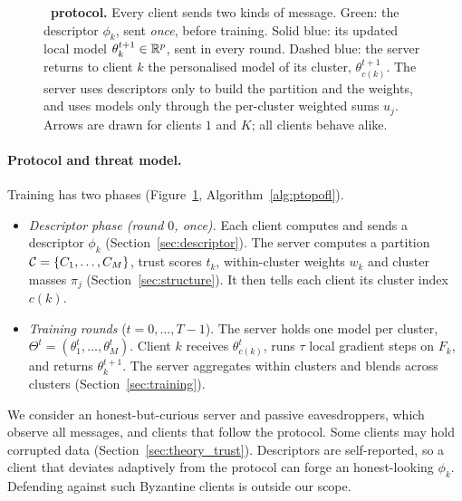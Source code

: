 \begin{figure}[t]
\caption{\textbf{\ptopofl\ protocol.} Every client sends two kinds of message. Green: the
descriptor $\phi_k$, sent \emph{once}, before training. Solid blue: its updated local model
$\theta_k^{t+1}\in\mathbb{R}^p$, sent in every round. Dashed blue: the server returns to client $k$
the personalised model of its cluster, $\theta_{c(k)}^{t+1}$. The server uses descriptors
only to build the partition and the weights, and uses models only through the per-cluster
weighted sums $u_j$. Arrows are drawn for clients $1$ and $K$; all clients behave alike.}
\label{fig:framework}
\end{figure}

\paragraph{Protocol and threat model.}
Training has two phases (Figure~\ref{fig:framework}, Algorithm~\ref{alg:ptopofl}).
\begin{itemize}[leftmargin=1.2em,itemsep=2pt]
  \item \emph{Descriptor phase (round $0$, once).} Each client computes and sends a
    descriptor $\phi_k$ (Section~\ref{sec:descriptor}). The server computes a partition
    $\mathcal{C}=\{C_1,\dots,C_M\}$, trust scores $t_k$, within-cluster weights $w_k$ and cluster
    masses $\pi_j$ (Section~\ref{sec:structure}). It then tells each client its cluster
    index $c(k)$.
  \item \emph{Training rounds} ($t=0,\dots,T-1$). The server holds one model per cluster,
    $\Theta^t=(\theta_1^t,\dots,\theta_M^t)$. Client $k$ receives $\theta^t_{c(k)}$, runs
    $\tau$ local gradient steps on $F_k$, and returns $\theta_k^{t+1}$. The server
    aggregates within clusters and blends across clusters (Section~\ref{sec:training}).
\end{itemize}
We consider an honest-but-curious server and passive eavesdroppers, which observe all
messages, and clients that follow the protocol. Some clients may hold corrupted data
(Section~\ref{sec:theory_trust}). Descriptors are self-reported, so a client that deviates
adaptively from the protocol can forge an honest-looking $\phi_k$. Defending against such
Byzantine clients is outside our scope.

